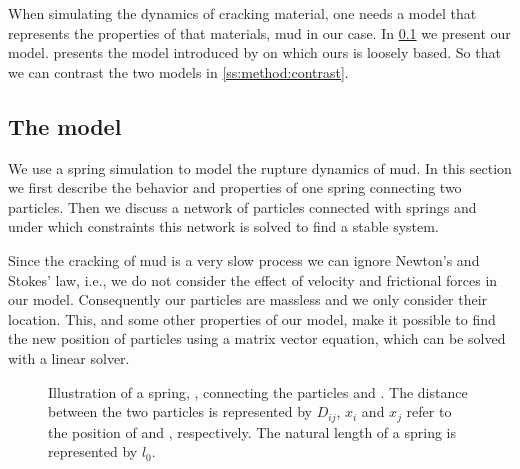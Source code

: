 
When simulating the dynamics of cracking material, one needs a model that represents the properties of that materials, mud in our case. In \cref{ss:method:model} we present our model.  presents the model introduced by \citeauthor{vogel2005studies2} on which ours is loosely based. So that we can contrast the two models in \cref{ss:method:contrast}.

\subsection{The model}\label{ss:method:model} 

We use a spring simulation to model the rupture dynamics of mud. In this section we first describe the behavior and properties of one spring connecting two particles. Then we discuss a network of particles connected with springs and under which constraints this network is solved to find a stable system. 

Since the cracking of mud is a very slow process we can ignore Newton's and Stokes' law, i.e., we do not consider the effect of velocity and frictional forces in our model. Consequently our particles are massless and we only consider their location. This, and some other properties of our model, make it possible to find the new position of particles using a matrix vector equation, which can be solved with a linear solver.

\begin{figure}
	\centering
	\caption{Illustration of a spring, , connecting the particles  and . The distance between the two particles is represented by $D_{ij}$, $x_i$ and $x_j$ refer to the position of  and , respectively. The natural length of a spring is represented by $l_0$.}
	\label{fig:method:spring}
\end{figure}

